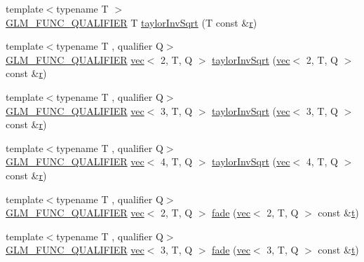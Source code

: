 \begin{DoxyCompactItemize}
{\footnotesize template$<$typename T $>$ }\\\hyperlink{setup_8hpp_a33fdea6f91c5f834105f7415e2a64407}{G\+L\+M\+\_\+\+F\+U\+N\+C\+\_\+\+Q\+U\+A\+L\+I\+F\+I\+ER} T \hyperlink{namespaceglm_1_1detail_a82e6fa9d633a5f76f8b7e046ac5d91f4}{taylor\+Inv\+Sqrt} (T const \&\hyperlink{_s_d_l__opengl_8h_a42ce7cdc612e53abee15043f80220d97}{r})
\item 
{\footnotesize template$<$typename T , qualifier Q$>$ }\\\hyperlink{setup_8hpp_a33fdea6f91c5f834105f7415e2a64407}{G\+L\+M\+\_\+\+F\+U\+N\+C\+\_\+\+Q\+U\+A\+L\+I\+F\+I\+ER} \hyperlink{structglm_1_1vec}{vec}$<$ 2, T, Q $>$ \hyperlink{namespaceglm_1_1detail_aa7082f2eab56cda8156f3ab94e8653a2}{taylor\+Inv\+Sqrt} (\hyperlink{structglm_1_1vec}{vec}$<$ 2, T, Q $>$ const \&\hyperlink{_s_d_l__opengl_8h_a42ce7cdc612e53abee15043f80220d97}{r})
\item 
{\footnotesize template$<$typename T , qualifier Q$>$ }\\\hyperlink{setup_8hpp_a33fdea6f91c5f834105f7415e2a64407}{G\+L\+M\+\_\+\+F\+U\+N\+C\+\_\+\+Q\+U\+A\+L\+I\+F\+I\+ER} \hyperlink{structglm_1_1vec}{vec}$<$ 3, T, Q $>$ \hyperlink{namespaceglm_1_1detail_a5de2dc069a7f92df3b0bfdd27b70e1c3}{taylor\+Inv\+Sqrt} (\hyperlink{structglm_1_1vec}{vec}$<$ 3, T, Q $>$ const \&\hyperlink{_s_d_l__opengl_8h_a42ce7cdc612e53abee15043f80220d97}{r})
\item 
{\footnotesize template$<$typename T , qualifier Q$>$ }\\\hyperlink{setup_8hpp_a33fdea6f91c5f834105f7415e2a64407}{G\+L\+M\+\_\+\+F\+U\+N\+C\+\_\+\+Q\+U\+A\+L\+I\+F\+I\+ER} \hyperlink{structglm_1_1vec}{vec}$<$ 4, T, Q $>$ \hyperlink{namespaceglm_1_1detail_a9547b07e16ac5f72eda78b5bf000fe14}{taylor\+Inv\+Sqrt} (\hyperlink{structglm_1_1vec}{vec}$<$ 4, T, Q $>$ const \&\hyperlink{_s_d_l__opengl_8h_a42ce7cdc612e53abee15043f80220d97}{r})
\item 
{\footnotesize template$<$typename T , qualifier Q$>$ }\\\hyperlink{setup_8hpp_a33fdea6f91c5f834105f7415e2a64407}{G\+L\+M\+\_\+\+F\+U\+N\+C\+\_\+\+Q\+U\+A\+L\+I\+F\+I\+ER} \hyperlink{structglm_1_1vec}{vec}$<$ 2, T, Q $>$ \hyperlink{namespaceglm_1_1detail_a4c0b9a9b95c2a1fead2e29b2538510cd}{fade} (\hyperlink{structglm_1_1vec}{vec}$<$ 2, T, Q $>$ const \&\hyperlink{_s_d_l__opengl_8h_a7d65d00ca3b0630d9b5c52df855b19f5}{t})
\item 
{\footnotesize template$<$typename T , qualifier Q$>$ }\\\hyperlink{setup_8hpp_a33fdea6f91c5f834105f7415e2a64407}{G\+L\+M\+\_\+\+F\+U\+N\+C\+\_\+\+Q\+U\+A\+L\+I\+F\+I\+ER} \hyperlink{structglm_1_1vec}{vec}$<$ 3, T, Q $>$ \hyperlink{namespaceglm_1_1detail_afaca75ccf77b14b266db747f83adb11a}{fade} (\hyperlink{structglm_1_1vec}{vec}$<$ 3, T, Q $>$ const \&\hyperlink{_s_d_l__opengl_8h_a7d65d00ca3b0630d9b5c52df855b19f5}{t})

\end{DoxyCompactItemize}
